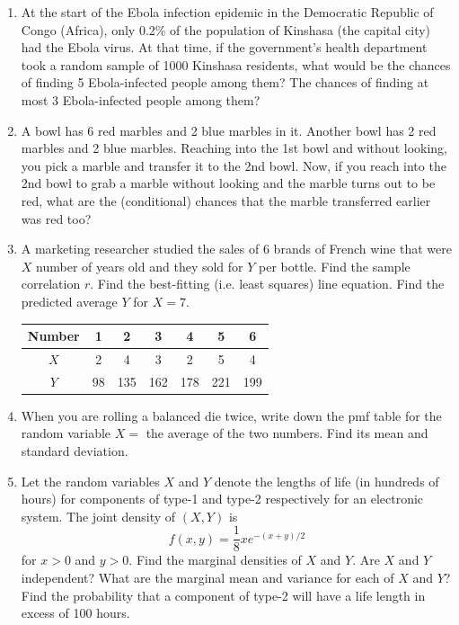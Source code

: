 \documentclass[11pt]{article}
\begin{document}
\begin{enumerate}[label=(\arabic*), leftmargin=*, itemsep=1.15em]
\item At the start of the Ebola infection epidemic in the Democratic Republic of Congo (Africa), only 0.2\% of the population of Kinshasa (the capital city) had the Ebola virus. At that time, if the government's health department took a random sample of 1000 Kinshasa residents, what would be the chances of finding 5 Ebola-infected people among them? The chances of finding at most 3 Ebola-infected people among them?

\item A bowl has 6 red marbles and 2 blue marbles in it. Another bowl has 2 red marbles and 2 blue marbles. Reaching into the 1st bowl and without looking, you pick a marble and transfer it to the 2nd bowl. Now, if you reach into the 2nd bowl to grab a marble without looking and the marble turns out to be red, what are the (conditional) chances that the marble transferred earlier was red too?

\item A marketing researcher studied the sales of 6 brands of French wine that were $X$ number of years old and they sold for $Y$ per bottle. Find the sample correlation $r$. Find the best-fitting (i.e. least squares) line equation. Find the predicted average $Y$ for $X=7$.

\begin{center}
\begin{tabular}{c|cccccc}
\toprule
Number & 1 & 2 & 3 & 4 & 5 & 6 \\
\midrule
$X$ & 2 & 4 & 3 & 2 & 5 & 4 \\
$Y$ & 98 & 135 & 162 & 178 & 221 & 199 \\
\bottomrule
\end{tabular}
\end{center}

\item When you are rolling a balanced die twice, write down the pmf table for the random variable $X=$ the average of the two numbers. Find its mean and standard deviation.

\item Let the random variables $X$ and $Y$ denote the lengths of life (in hundreds of hours) for components of type-1 and type-2 respectively for an electronic system. The joint density of $(X,Y)$ is
\[
    f(x,y)=\frac{1}{8}xe^{-(x+y)/2}
\]
for $x>0$ and $y>0$. Find the marginal densities of $X$ and $Y$. Are $X$ and $Y$ independent? What are the marginal mean and variance for each of $X$ and $Y$? Find the probability that a component of type-2 will have a life length in excess of 100 hours.


\end{enumerate}
\end{document}
